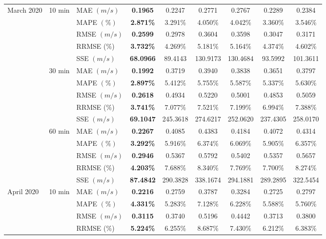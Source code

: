 {\begin{longtable}[htb!]{lllcccccc}
March 2020 & 10 min & MAE {$(m/s)$} & \textbf{0.1965} & 0.2247 & 0.2771 & 0.2767 & 0.2289 & 0.2384 \\
&  & MAPE {$(\%)$} & \textbf{2.871\%} & 3.291\% & 4.050\% & 4.042\% & 3.360\% & 3.546\% \\
&  & RMSE {$(m/s)$} & \textbf{0.2599} & 0.2978 & 0.3604 & 0.3598 & 0.3047 & 0.3171 \\
& {} & {RRMSE {(\%)}} & {\textbf{3.732\%}} & {4.269\%} & {5.181\%} & {5.164\%} & {4.374\%} & {4.602\%} \\
& {} & {SSE {$(m/s)$}} & {\textbf{68.0966}} & {89.4143} & {130.9173} & {130.4684} & {93.5992} & {101.3611} \\
& 30 min & MAE {$(m/s)$} & \textbf{0.1992} & 0.3719 & 0.3940 & 0.3838 & 0.3651 & 0.3797 \\
&  & MAPE {$(\%)$} & \textbf{2.897\%} & 5.412\% & 5.755\% & 5.587\% & 5.337\% & 5.630\% \\
&  & RMSE {$(m/s)$} & \textbf{0.2618} & 0.4934 & 0.5220 & 0.5001 & 0.4853 & 0.5059 \\
& {} & {RRMSE {(\%)}} & {\textbf{3.741\%}} & {7.077\%} & {7.521\%} & {7.199\%} & {6.994\%} & {7.388\%} \\
& {} & {SSE {$(m/s)$}} & {\textbf{69.1047}} & {245.3618} & {274.6217} & {252.0620} & {237.4305} & {258.0170} \\
& 60 min & MAE {$(m/s)$} & \textbf{0.2267} & 0.4085 & 0.4383 & 0.4184 & 0.4072 & 0.4314 \\
&  & MAPE {$(\%)$} & \textbf{3.292\%} & 5.916\% & 6.374\% & 6.069\% & 5.905\% & 6.357\% \\
&  & RMSE {$(m/s)$} & \textbf{0.2946} & 0.5367 & 0.5792 & 0.5402 & 0.5357 & 0.5657 \\
& {} & {RRMSE {(\%)}} & {\textbf{4.203\%}} & {7.688\%} & {8.340\%} & {7.769\%} & {7.700\%} & {8.274\%} \\
& {} & {SSE {$(m/s)$}} & {\textbf{87.4842}} & {290.3828} & {338.1674} & {294.1881} & {289.2895} & {322.5454} \\ \hline
April 2020 & 10 min & MAE {$(m/s)$} & \textbf{0.2216} & 0.2759 & 0.3787 & 0.3284 & 0.2725 & 0.2797 \\
&  & MAPE {$(\%)$} & \textbf{4.331\%} & 5.283\% & 7.128\% & 6.228\% & 5.588\% & 5.760\% \\
&  & RMSE {$(m/s)$} & \textbf{0.3115} & 0.3740 & 0.5196 & 0.4442 & 0.3713 & 0.3800 \\
& {} & {RRMSE {(\%)}} & {\textbf{5.224\%}} & {6.255\%} & {8.687\%} & {7.430\%} & {6.212\%} & {6.383\%} \\

\end{longtable}}
